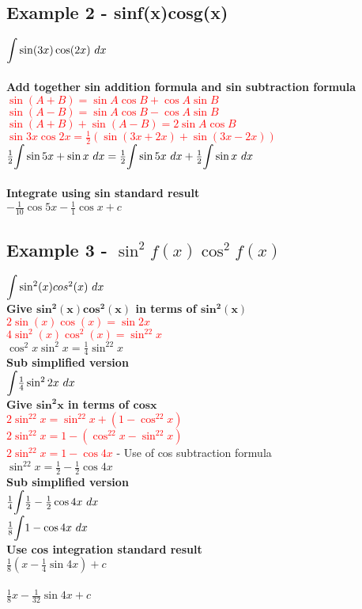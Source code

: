 \documentclass{article}[18pt]
\begin{document}
\subsection{Example 2 - sinf(x)cosg(x)}
$\mathlarger{\int}\sin(3x)\cos(2x) \ dx$\\
\\
\textbf{Add together sin addition formula and sin subtraction formula}\\
\textcolor{red}{$\sin(A+B)=\sin A\cos B+\cos A\sin B$}\\
\textcolor{red}{$\sin(A-B)=\sin A\cos B-\cos A\sin B$}\\
\textcolor{red}{$\sin(A+B)+\sin(A-B)=2\sin A\cos B$}\\
\textcolor{red}{$\sin 3x\cos 2x=\frac{1}{2}(\sin(3x+2x)+\sin(3x-2x))$}\\
$\frac{1}{2}\mathlarger{\int}\sin5x+\sin x \ dx=\frac{1}{2}\mathlarger{\int}\sin5x \ dx+\frac{1}{2}\mathlarger{\int}\sin x \ dx$\\
\\
\textbf{Integrate using sin standard result}\\
$-\frac{1}{10}\cos5x-\frac{1}{1}\cos x+c$
\subsection{Example 3 - $\sin^2f(x)\cos^2f(x)$}
$\mathlarger{\int}\sin^2(x)cos^2(x) \ dx$\\
\textbf{Give $\mathbf{sin^2(x)cos^2(x)}$ in terms of $\mathbf{sin^2(x)}$}\\
\textcolor{red}{$2\sin(x)\cos(x)=\sin2x$}\\
\textcolor{red}{$4\sin^2(x)\cos^2(x)=\sin^22x$}\\
$\cos^2x\sin^2x=\frac{1}{4}\sin^22x$\\
\textbf{Sub simplified version}\\
$\mathlarger{\int}\frac{1}{4}\sin^22x \ dx$\\
\textbf{Give $\mathbf{sin^2x}$ in terms of $\mathbf{cosx}$}\\
\textcolor{red}{$2\sin^22x=\sin^22x+(1-\cos^22x)$}\\
\textcolor{red}{$2\sin^22x=1-(\cos^22x-\sin^22x)$}\\
\textcolor{red}{$2\sin^22x=1-\cos4x$} - Use of cos subtraction formula\\
$\sin^22x=\frac{1}{2}-\frac{1}{2}\cos4x$\\
\textbf{Sub simplified version}\\
$\frac{1}{4}\mathlarger{\int}\frac{1}{2}-\frac{1}{2}\cos4x \ dx$\\
$\frac{1}{8}\mathlarger{\int}1-\cos4x \ dx$\\
\textbf{Use cos integration standard result}\\
$\frac{1}{8}(x-\frac{1}{4}\sin4x)+c$\\
\\
$\frac{1}{8}x-\frac{1}{32}\sin4x+c$\\
\newpage
\end{document}
